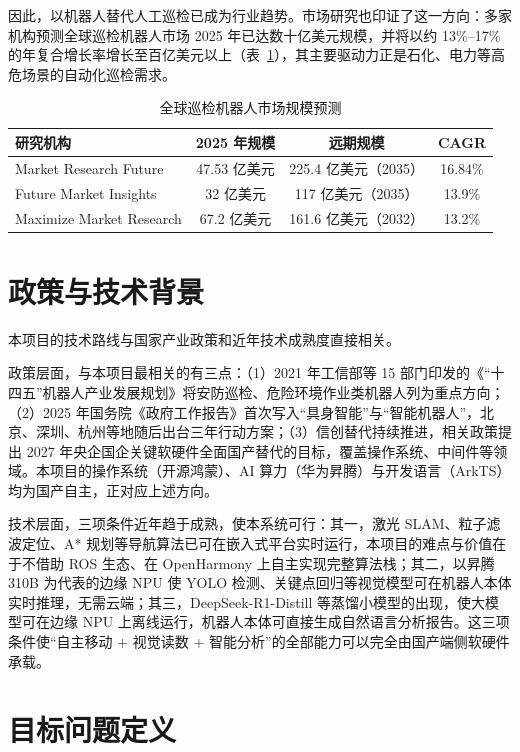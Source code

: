 因此，以机器人替代人工巡检已成为行业趋势。市场研究也印证了这一方向：多家机构预测全球巡检机器人市场 2025 年已达数十亿美元规模，并将以约 13\%--17\% 的年复合增长率增长至百亿美元以上（表~\ref{tab:market-forecast}），其主要驱动力正是石化、电力等高危场景的自动化巡检需求。

\begin{table}[htbp]
\centering
\caption{全球巡检机器人市场规模预测}
\label{tab:market-forecast}
\begin{tabularx}{\textwidth}{Xccc}
\toprule
\textbf{研究机构} & \textbf{2025 年规模} & \textbf{远期规模} & \textbf{CAGR} \\
\midrule
Market Research Future & 47.53 亿美元 & 225.4 亿美元（2035） & 16.84\% \\
Future Market Insights & 32 亿美元 & 117 亿美元（2035） & 13.9\% \\
Maximize Market Research & 67.2 亿美元 & 161.6 亿美元（2032） & 13.2\% \\
\bottomrule
\end{tabularx}
\end{table}

\section{政策与技术背景}
\label{sec:policy-background}

本项目的技术路线与国家产业政策和近年技术成熟度直接相关。

政策层面，与本项目最相关的有三点：（1）2021 年工信部等 15 部门印发的《“十四五”机器人产业发展规划》将安防巡检、危险环境作业类机器人列为重点方向；（2）2025 年国务院《政府工作报告》首次写入“具身智能”与“智能机器人”，北京、深圳、杭州等地随后出台三年行动方案；（3）信创替代持续推进，相关政策提出 2027 年央企国企关键软硬件全面国产替代的目标，覆盖操作系统、中间件等领域。本项目的操作系统（开源鸿蒙）、AI 算力（华为昇腾）与开发语言（ArkTS）均为国产自主，正对应上述方向。

技术层面，三项条件近年趋于成熟，使本系统可行：其一，激光 SLAM、粒子滤波定位、A* 规划等导航算法已可在嵌入式平台实时运行，本项目的难点与价值在于不借助 ROS 生态、在 OpenHarmony 上自主实现完整算法栈；其二，以昇腾 310B 为代表的边缘 NPU 使 YOLO 检测、关键点回归等视觉模型可在机器人本体实时推理，无需云端；其三，DeepSeek-R1-Distill 等蒸馏小模型的出现，使大模型可在边缘 NPU 上离线运行，机器人本体可直接生成自然语言分析报告。这三项条件使“自主移动 + 视觉读数 + 智能分析”的全部能力可以完全由国产端侧软硬件承载。

\section{目标问题定义}
\label{sec:problem-definition}

